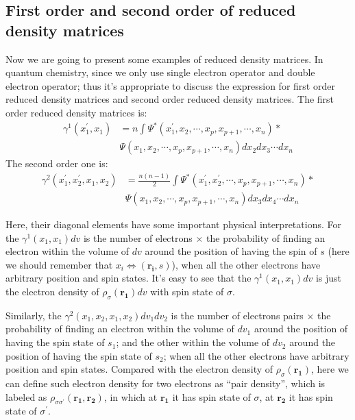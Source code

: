 \subsection{First order and second order of reduced density matrices}
\label{RDM1_and_EDM2}
%
%
%
Now we are going to present some examples of reduced density
matrices. In quantum chemistry, since we only use single electron
operator and double electron operator; thus it's appropriate to
discuss the expression for first order reduced density matrices and
second order reduced density matrices. The first order reduced
density matrices is:
\begin{align}\label{}
  \gamma^{1}(x^{'}_{1}, x_{1}) &= n\int \Psi^{*}(x^{'}_{1}, x_{2},
  \cdots, x_{p}, x_{p+1},
  \cdots, x_{n})* \nonumber \\
  & \Psi(x_{1}, x_{2}, \cdots, x_{p}, x_{p+1}, \cdots,
  x_{n})dx_{2}dx_{3}\cdots dx_{n}
\end{align}
The second order one is:
\begin{align}\label{}
  \gamma^{2}(x^{'}_{1},x^{'}_{2}, x_{1},x_{2}) &= \frac{n(n-1)}{2}\int
  \Psi^{*}(x^{'}_{1}, x^{'}_{2}, \cdots, x_{p}, x_{p+1},
  \cdots, x_{n})* \nonumber \\
  & \Psi(x_{1}, x_{2}, \cdots, x_{p}, x_{p+1}, \cdots,
  x_{n})dx_{3}dx_{4}\cdots dx_{n}
\end{align}

Here, their diagonal elements have some important physical
interpretations. For the $\gamma^{1}(x_{1}, x_{1})dv$ is the number
of electrons $\times$ the probability of finding an electron within
the volume of $dv$ around the position of  having the
spin of $s$ (here we should remember that $x_{i} \Leftrightarrow
(\mathbf{r_{i}}, s)$), when all the other electrons have arbitrary
position and spin states. It's easy to see that the
$\gamma^{1}(x_{1}, x_{1})dv$ is just the electron density of
$\rho_{\sigma}(\bm{r_{1}})dv$ with spin state of $\sigma$.

Similarly, the $\gamma^{2}(x_{1},x_{2},x_{1},x_{2})dv_{1}dv_{2}$ is
the number of electrons pairs $\times$ the probability of finding an
electron within the volume of $dv_{1}$ around the position of
 having the spin state of $s_{1}$; and the other within
the volume of $dv_{2}$ around the position of  having
the spin state of $s_{2}$; when all the other electrons have
arbitrary position and spin states. Compared with the electron
density of $\rho_{\sigma}(\bm{r_{1}})$, here we can define such
electron density for two electrons as ``pair density'', which is
labeled as $\rho_{\sigma\sigma^{'}}(\bm{r_{1}}, \bm{r_{2}})$, in
which at $\bm{r_{1}}$ it has spin state of $\sigma$, at $\bm{r_{2}}$
it has spin state of $\sigma^{'}$.

